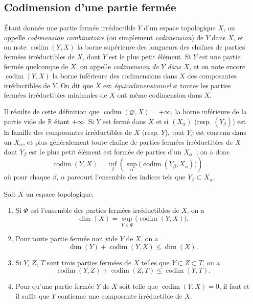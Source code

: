 \subsection{Codimension d'une partie fermée}
\label{subsection:0.14.2-fr}

\begin{definition}[14.2.1]
\label{0.14.2.1-fr}
Étant donnée une partie fermée irréductible $Y$ d'un espace topologique $X$,
on appelle \emph{codimension combinatoire} (ou simplement \emph{codimension})
de $Y$ dans $X$, et on note $\operatorname{codim}(Y,X)$ la borne supérieure
des longueurs des chaînes de parties fermées irréductibles de $X$, dont $Y$
est le plus petit élément. Si $Y$ est une partie fermée quelconque de $X$, on
appelle \emph{codimension de $Y$ dans $X$}, et on note encore
$\operatorname{codim}(Y,X)$ la borne inférieure des codimensions dans $X$ des
composantes irréductibles de $Y$. On dit que $X$ est
\emph{équicodimensionnel} si toutes les parties fermées irréductibles minimales
de $X$ ont même codimension dans $X$.
\end{definition}

Il résulte de cette définition que
$\operatorname{codim}(\varnothing,X)=+\infty$, la borne inférieure de la
partie vide de $\overline{\mathbb R}$ étant $+\infty$. Si $Y$ est fermé dans
$X$ et si $(X_\alpha)$ (resp. $(Y_\beta)$) est la famille des composantes
irréductibles de $X$ (resp. $Y$), tout $Y_\beta$ est contenu dans un
$X_\alpha$, et plus généralement toute chaîne de parties fermées
irréductibles de $X$ dont $Y_\beta$ est le plus petit élément est formée de
parties d'un $X_\alpha$~; on a donc
\[
  \operatorname{codim}(Y,X)=
  \inf_\beta\left(\sup_\alpha
  \bigl(\operatorname{codim}(Y_\beta,X_\alpha)\bigr)\right)
  \tag{14.2.1.1}\label{0.14.2.1.1-fr}
\]
où pour chaque $\beta$, $\alpha$ parcourt l'ensemble des indices tels que
$Y_\beta\subset X_\alpha$.

\begin{proposition}[14.2.2]
\label{0.14.2.2-fr}
Soit $X$ un espace topologique.
\begin{enumerate}
  \item[\rm(i)] Si $\Phi$ est l'ensemble des parties fermées irréductibles de
  $X$, on a
  \[
    \dim(X)=\sup_{Y\in\Phi}\bigl(\operatorname{codim}(Y,X)\bigr).
    \tag{14.2.2.1}\label{0.14.2.2.1-fr}
  \]
  \item[\rm(ii)] Pour toute partie fermée non vide $Y$ de $X$, on a
  \[
    \dim(Y)+\operatorname{codim}(Y,X)\leq\dim(X).
    \tag{14.2.2.2}\label{0.14.2.2.2-fr}
  \]
  \item[\rm(iii)] Si $Y$, $Z$, $T$ sont trois parties fermées de $X$ telles
  que $Y\subset Z\subset T$, on a
  \[
    \operatorname{codim}(Y,Z)+\operatorname{codim}(Z,T)
    \leq\operatorname{codim}(Y,T).
    \tag{14.2.2.3}\label{0.14.2.2.3-fr}
  \]
  \item[\rm(iv)] Pour qu'une partie fermée $Y$ de $X$ soit telle que
  $\operatorname{codim}(Y,X)=0$, il faut et il suffit que $Y$ contienne une
  composante irréductible de $X$.
\end{enumerate}
\end{proposition}

